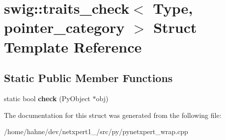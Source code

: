 \hypertarget{structswig_1_1traits__check_3_01Type_00_01pointer__category_01_4}{}\section{swig\+:\+:traits\+\_\+check$<$ Type, pointer\+\_\+category $>$ Struct Template Reference}
\label{structswig_1_1traits__check_3_01Type_00_01pointer__category_01_4}
\subsection*{Static Public Member Functions}
\begin{DoxyCompactItemize}
\item 
static bool {\bfseries check} (Py\+Object $\ast$obj)\hypertarget{structswig_1_1traits__check_3_01Type_00_01pointer__category_01_4_ae3cc14b7411d171e1cf97aabd9ff92c5}{}\label{structswig_1_1traits__check_3_01Type_00_01pointer__category_01_4_ae3cc14b7411d171e1cf97aabd9ff92c5}

\end{DoxyCompactItemize}


The documentation for this struct was generated from the following file\+:\begin{DoxyCompactItemize}
\item 
/home/hahne/dev/netxpert1\+\_/src/py/pynetxpert\+\_\+wrap.\+cpp\end{DoxyCompactItemize}
